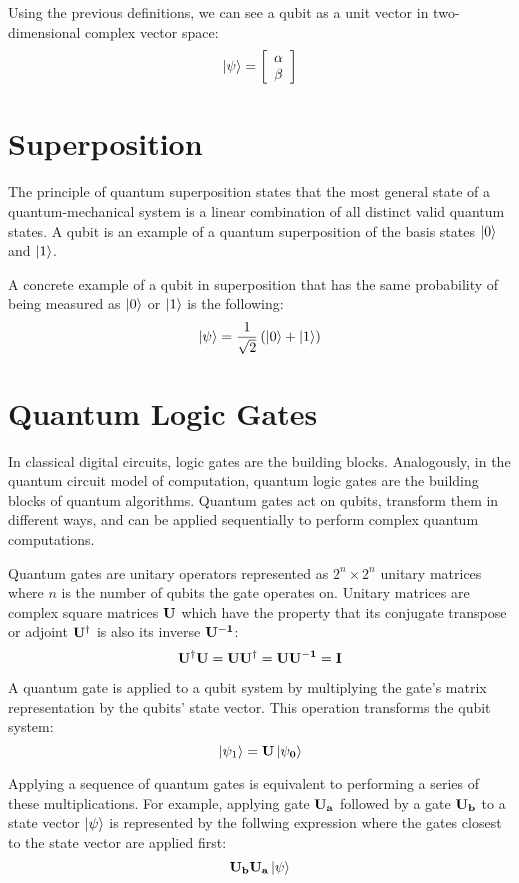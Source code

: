 Using the previous definitions, we can see a qubit as a unit vector in two-dimensional complex vector space:
\[\left|{\psi}\right\rangle=\left[\begin{array}{c}\alpha \\ \beta\end{array}\right]\]

\section{Superposition}

The principle of quantum superposition states that the most general state of a quantum-mechanical system is a linear combination of all distinct valid quantum states. A qubit is an example of a quantum superposition of the basis states $\left|{0}\right\rangle$ and $\left|{1}\right\rangle$.

A concrete example of a qubit in superposition that has the same probability of being measured as $\left|{0}\right\rangle$ or $\left|{1}\right\rangle$ is the following:
$$\left|{\psi}\right\rangle=\frac{1}{\sqrt{2}}\left(\left|{0}\right\rangle+\left|{1}\right\rangle\right)$$

\section{Quantum Logic Gates}

In classical digital circuits, logic gates are the building blocks. Analogously, in the quantum circuit model of computation, quantum logic gates are the building blocks of quantum algorithms. Quantum gates act on qubits, transform them in different ways, and can be applied sequentially to perform complex quantum computations.

Quantum gates are unitary operators represented as $2^n \times 2^n$ unitary matrices where $n$ is the number of qubits the gate operates on. Unitary matrices are complex square matrices $\bf{U}$ which have the property that its conjugate transpose or adjoint $\bf{U^{\dagger}}$ is also its inverse $\bf{U^{-1}}$:
$$\bf{U^{\dagger}U}=\bf{UU^{\dagger}}=\bf{UU^{-1}}=I$$

A quantum gate is applied to a qubit system by multiplying the gate's matrix representation by the qubits' state vector. This operation transforms the qubit system:
$$\left|{\psi_1}\right\rangle=\bf{U}\left|{\psi_0}\right\rangle$$

Applying a sequence of quantum gates is equivalent to performing a series of these multiplications. For example, applying gate $\bf{U_a}$ followed by a gate $\bf{U_b}$ to a state vector $\left|{\psi}\right\rangle$ is represented by the follwing expression where the gates closest to the state vector are applied first:
$$\bf{U_b}\bf{U_a}\left|{\psi}\right\rangle$$

